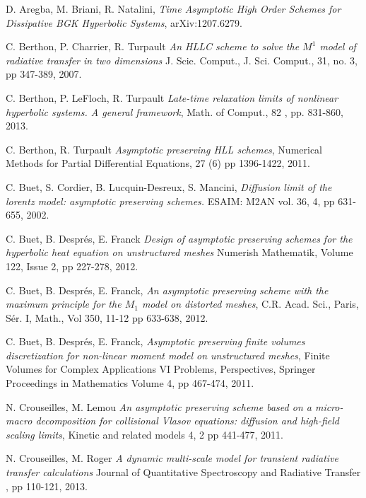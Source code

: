 \documentclass[a4paper,french,english,10pt]{article}
\begin{document}
{\footnotesize 
\begin{thebibliography}{abcde}   

 D. Aregba, M. Briani, R. Natalini, \emph{Time Asymptotic High Order Schemes for Dissipative BGK Hyperbolic Systems}, arXiv:1207.6279.

 C. Berthon, P. Charrier, R. Turpault \emph{An HLLC scheme
to solve the $M^1$ model of radiative transfer in two dimensions} J. Scie.
Comput., J. Sci. Comput., 31, no. 3, pp 347-389, 2007.

 C. Berthon, P. LeFloch, R. Turpault  \emph{Late-time relaxation limits of nonlinear hyperbolic systems. A general framework}, Math. of Comput., 82 , pp. 831-860, 2013. 

 C. Berthon, R. Turpault \emph{Asymptotic preserving HLL
schemes}, Numerical Methods for Partial Differential Equations, 27 (6)  pp
1396-1422, 2011.

 C. Buet, S. Cordier,   B. Lucquin-Desreux, S. Mancini, 
\emph{Diffusion limit of the lorentz model: asymptotic preserving schemes.}
ESAIM: M2AN vol. 36, 4, pp 631-655, 2002.

 C. Buet, B. Despr\'es, E. Franck \emph{Design of
asymptotic preserving schemes for the hyperbolic heat equation on unstructured
meshes} Numerish Mathematik, Volume 122, Issue 2, pp 227-278,  2012.

 C. Buet, B. Despr\'es, E. Franck, \emph{An asymptotic
preserving scheme with the maximum principle for the $M_1$ model on distorted
meshes}, C.R. Acad. Sci., Paris, S\'er. I, Math., Vol 350,  11-12
pp 633-638,  2012.

 C. Buet, B. Despr\'es, E. Franck, \emph{Asymptotic
preserving finite volumes discretization for non-linear moment model on
unstructured meshes}, Finite Volumes for Complex Applications VI Problems,
Perspectives, Springer Proceedings in Mathematics Volume 4, pp 467-474, 2011.



 N. Crouseilles, M. Lemou \emph{An asymptotic preserving
scheme based on a micro-macro decomposition for collisional Vlasov equations:
diffusion and high-field scaling limits}, Kinetic and related models 4, 2 
pp 441-477, 2011.

 N. Crouseilles, M. Roger \emph{A dynamic multi-scale
model for transient radiative transfer calculations} Journal of Quantitative
Spectroscopy and Radiative Transfer , pp 110-121, 2013.


\end{thebibliography}}
\end{document}

